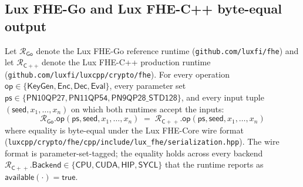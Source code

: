 
\subsection*{Lux FHE-Go and Lux FHE-C++ byte-equal output}

\begin{theorem}
\label{thm:fhe-dual-runtime-equivalence}
Let $\mathcal{R}_{\mathsf{Go}}$ denote the Lux FHE-Go reference runtime
(\texttt{github.com/luxfi/fhe}) and let $\mathcal{R}_{\mathsf{C++}}$ denote the
Lux FHE-C++ production runtime (\texttt{github.com/luxfi/luxcpp/crypto/fhe}).
For every operation $\mathsf{op} \in \{\mathsf{KeyGen}, \mathsf{Enc}, \mathsf{Dec},
\mathsf{Eval}\}$, every parameter set $\mathsf{ps} \in
\{\mathsf{PN10QP27}, \mathsf{PN11QP54}, \mathsf{PN9QP28\_STD128}\}$, and every
input tuple $(\mathsf{seed}, x_1, \ldots, x_n)$ on which both runtimes accept
the inputs:
\[
  \mathcal{R}_{\mathsf{Go}}.\mathsf{op}(\mathsf{ps}, \mathsf{seed}, x_1, \ldots, x_n)
  \;=\;
  \mathcal{R}_{\mathsf{C\!+\!\!+}}.\mathsf{op}(\mathsf{ps}, \mathsf{seed}, x_1, \ldots, x_n)
\]
where equality is byte-equal under the Lux FHE-Core wire format
(\texttt{luxcpp/crypto/fhe/cpp/include/lux\_fhe/serialization.hpp}). The wire
format is parameter-set-tagged; the equality holds across every backend
$\mathcal{R}_{\mathsf{C\!+\!\!+}}.\mathsf{Backend} \in \{\mathsf{CPU},
\mathsf{CUDA}, \mathsf{HIP}, \mathsf{SYCL}\}$ that the runtime reports as
$\mathsf{available}(\cdot) = \mathsf{true}$.
\end{theorem}


